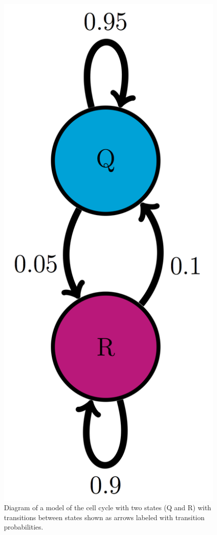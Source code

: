 \documentclass[
  letterpaper,
  DIV=11,
  numbers=noendperiod]{scrreprt}
\begin{document}
\begin{figure}

{\centering \includegraphics{./ch10/QR_trans_diag.png}

}

\caption{Diagram of a model of the cell cycle with two states (Q and R)
with transitions between states shown as arrows labeled with transition
probabilities.}

\end{figure}
\end{document}
